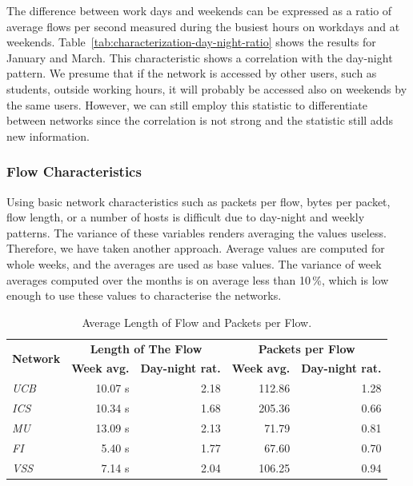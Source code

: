 The difference between work days and weekends can be expressed as a ratio of average flows per second measured during the busiest hours on workdays and at weekends. Table~\ref{tab:characterization-day-night-ratio} shows the results for January and March. This characteristic shows a correlation with the day-night pattern. 
We presume that if the network is accessed by other users, such as students, outside working hours, it will probably be accessed also on weekends by the same users.
However, we can still employ this statistic to differentiate between networks since the correlation is not strong and the statistic still adds new information.

\subsubsection{Flow Characteristics}

Using basic network characteristics such as packets per flow, bytes per packet, flow length, or a number of hosts is difficult due to day-night and weekly patterns. The variance of these variables renders averaging the values useless. Therefore, we have taken another approach. Average values are computed for whole weeks, and the averages are used as base values. The variance of week averages computed over the months is on average less than 10\,\%, which is low enough to use these values to characterise the networks. 

\begin{table}[!t]
        \centering
        \renewcommand{\arraystretch}{1.1}
        \setlength{\tabcolsep}{5pt}
        \begin{tabular}{|l|r|r|r|r|} \hline
                \multirow{2}{*}{\centering\textbf{Network}} & \multicolumn{2}{c|}{\textbf{Length of The Flow}} & \multicolumn{2}{c|}{\textbf{Packets per Flow}} \\ \cline{2-5}
                  & \textbf{Week avg.} & \textbf{Day-night rat.} & \textbf{Week avg.} & \textbf{Day-night rat.} \\ \hline
                \textit{UCB} &  10.07 s & 2.18 &  112.86 & 1.28 \\ \hline
                \textit{ICS} & 10.34 s & 1.68 & 205.36 &  0.66 \\  \hline
                \textit{MU} & 13.09 s & 2.13 & 71.79  & 0.81 \\  \hline
                \textit{FI} & 5.40 s & 1.77 & 67.60 & 0.70 \\  \hline
                \textit{VSS} & 7.14 s & 2.04 & 106.25 & 0.94 \\  \hline
        \end{tabular}
        \caption{Average Length of Flow and Packets per Flow.}
        \label{tab:characterization-avg-lengths}
\end{table}

